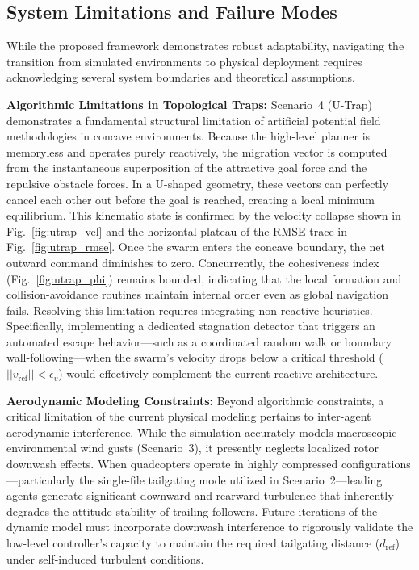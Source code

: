 \documentclass[pdflatex,sn-basic]{sn-jnl}%
\begin{document}
    \subsection{System Limitations and Failure Modes} \label{sec:analysis_limitations}

        While the proposed framework demonstrates robust adaptability, navigating the transition from simulated environments to physical deployment requires acknowledging several system boundaries and theoretical assumptions.

        \textbf{Algorithmic Limitations in Topological Traps:} Scenario~4 (U-Trap) demonstrates a fundamental structural limitation of artificial potential field methodologies in concave environments. Because the high-level planner is memoryless and operates purely reactively, the migration vector is computed from the instantaneous superposition of the attractive goal force and the repulsive obstacle forces. In a U-shaped geometry, these vectors can perfectly cancel each other out before the goal is reached, creating a local minimum equilibrium. This kinematic state is confirmed by the velocity collapse shown in Fig.~\ref{fig:utrap_vel} and the horizontal plateau of the RMSE trace in Fig.~\ref{fig:utrap_rmse}. Once the swarm enters the concave boundary, the net outward command diminishes to zero. Concurrently, the cohesiveness index (Fig.~\ref{fig:utrap_phi}) remains bounded, indicating that the local formation and collision-avoidance routines maintain internal order even as global navigation fails. Resolving this limitation requires integrating non-reactive heuristics. Specifically, implementing a dedicated stagnation detector that triggers an automated escape behavior---such as a coordinated random walk or boundary wall-following---when the swarm's velocity drops below a critical threshold ($||v_{\text{ref}}|| < \epsilon_v$) would effectively complement the current reactive architecture.

        \textbf{Aerodynamic Modeling Constraints:} Beyond algorithmic constraints, a critical limitation of the current physical modeling pertains to inter-agent aerodynamic interference. While the simulation accurately models macroscopic environmental wind gusts (Scenario~3), it presently neglects localized rotor downwash effects. When quadcopters operate in highly compressed configurations---particularly the single-file tailgating mode utilized in Scenario~2---leading agents generate significant downward and rearward turbulence that inherently degrades the attitude stability of trailing followers. Future iterations of the dynamic model must incorporate downwash interference to rigorously validate the low-level controller's capacity to maintain the required tailgating distance ($d_{\text{ref}}$) under self-induced turbulent conditions.
\end{document}
